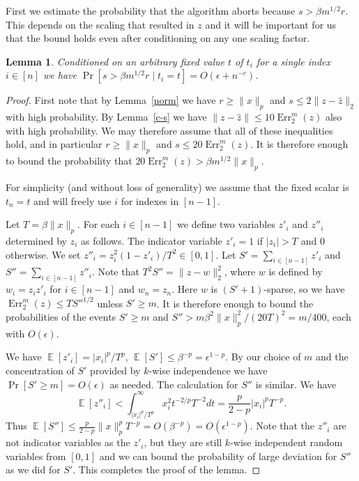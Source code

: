 \documentclass[9pt,letterpaper]{article}
\newtheorem{lemma}{Lemma}
\theoremstyle{remark}
\DeclareMathOperator*{\E}{\mathbb{E}}
\DeclareMathOperator{\err}{Err}
\begin{document}
First we estimate the probability that the algorithm aborts because $s>\beta
m^{1/2}r$. This depends on the scaling that resulted in $z$ and it will be important
for us that the bound holds even after conditioning on any one scaling factor.

\begin{lemma}\label{abort}
Conditioned on an arbitrary fixed value $t$ of $t_i$ for a single index
$i\in[n]$ we have $\Pr[s>\beta m^{1/2}r\mid t_i=t]=O(\epsilon+n^{-c})$.
\end{lemma}

\begin{proof}
First note that by Lemma~\ref{norm} we have $r\ge\|x\|_p$ and
$s\le2\|z-\hat z\|_2$ with high probability. By
Lemma~\ref{c-s} we have $\|z-\hat z\|\le10\err_2^m(z)$ also
with high probability. We may therefore assume that all of these inequalities
hold, and in particular
$r\ge\|x\|_p$ and $s\le20\err_2^m(z)$. It is therefore enough to bound the
probability that $20\err_2^m(z)>\beta m^{1/2}\|x\|_p$.

For simplicity (and without loss of generality) we assume that the fixed
scalar is $t_n=t$ and will freely use $i$ for indexes in $[n-1]$.

Let $T=\beta\|x\|_p$. For each $i\in[n-1]$ we define
two variables $z'_i$ and $z''_i$ determined by $z_i$ as follows. The indicator
variable $z'_i=1$ if $|z_i|>T$ and $0$ otherwise. We set
$z''_i=z_i^2(1-z'_i)/T^2\in[0,1]$. Let $S'=\sum_{i\in[n-1]}z'_i$ and
$S''=\sum_{i\in[n-1]}z''_i$. Note that $T^2S''=\|z-w\|_2^2$, where $w$ is
defined by $w_i=z_iz'_i$ for $i\in[n-1]$ and $w_n=z_n$. Here $w$ is
$(S'+1)$-sparse, so we have $\err_2^m(z)\le TS''^{1/2}$ unless $S'\ge m$.
It is therefore enough to bound the probabilities of the events
$S'\ge m$ and $S''>m\beta^2\|x\|_p^2/(20T)^2=m/400$, each with  $O(\epsilon)$.

We have $\E[z'_i]=|x_i|^p/T^p$, $\E[S']\le\beta^{-p}=\epsilon^{1-p}$. By our
choice of $m$ and the concentration of $S'$ provided by $k$-wise independence
we have $\Pr[S'\ge m]=O(\epsilon)$ as needed.
The calculation for $S''$ is similar. We have
$$\E[z''_i]<\int_{|x_i|^p/T^p}^\infty x_i^2t^{-2/p}T^{-2}dt=\frac
p{2-p}|x_i|^pT^{-p}.$$ Thus $\E[S'']\le\frac
p{2-p}\|x\|_p^pT^{-p}=O(\beta^{-p})=O(\epsilon^{1-p})$. Note that the $z''_i$
are not indicator variables as the $z'_i$, but they are still $k$-wise
independent random variables from $[0,1]$ and we can bound the probability of
large deviation for $S''$ as we did for $S'$. This completes the proof of the
lemma.
\end{proof}
\end{document}
